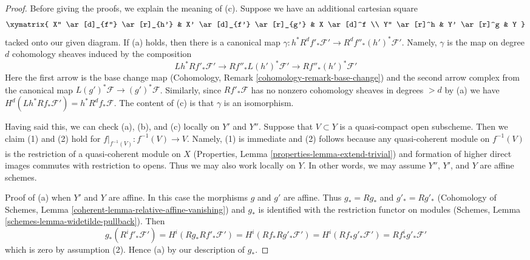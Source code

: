 \begin{proof}
Before giving the proofs, we explain the meaning of (c). Suppose
we have an additional cartesian square
$$
\xymatrix{
X'' \ar[d]_{f''} \ar[r]_{h'} &
X' \ar[d]_{f'} \ar[r]_{g'} &
X \ar[d]^f \\
Y'' \ar[r]^h &
Y' \ar[r]^g &
Y
}
$$
tacked onto our given diagram. If (a) holds, then there is a canonical
map $\gamma : h^*R^df'_*\mathcal{F}' \to R^df''_*(h')^*\mathcal{F}'$.
Namely, $\gamma$ is the map on degree $d$ cohomology sheaves
induced by the composition
$$
Lh^*Rf'_*\mathcal{F}' \longrightarrow
Rf''_*L(h')^*\mathcal{F}' \longrightarrow Rf''_*(h')^*\mathcal{F}'
$$
Here the first arrow is the base change map
(Cohomology, Remark \ref{cohomology-remark-base-change}) and
the second arrow complex from the canonical map
$L(g')^*\mathcal{F} \to (g')^*\mathcal{F}$.
Similarly, since $Rf'_*\mathcal{F}$ has no nonzero cohomology sheaves in
degrees $> d$ by (a) we have
$H^d(Lh^*Rf_*\mathcal{F}') = h^*R^df_*\mathcal{F}$.
The content of (c) is that $\gamma$ is an isomorphism.

\medskip\noindent
Having said this, we can check (a), (b), and (c) locally on $Y'$ and $Y''$.
Suppose that $V \subset Y$ is a quasi-compact open subscheme. Then we
claim (1) and (2) hold for $f|_{f^{-1}(V)} : f^{-1}(V) \to V$.
Namely, (1) is immediate and (2) follows because any quasi-coherent
module on $f^{-1}(V)$ is the restriction of a quasi-coherent module
on $X$ (Properties, Lemma \ref{properties-lemma-extend-trivial}) and formation
of higher direct images commutes with restriction to opens.
Thus we may also work locally on $Y$. In other words, we may
assume $Y''$, $Y'$, and $Y$ are affine schemes.

\medskip\noindent
Proof of (a) when $Y'$ and $Y$ are affine. In this case the morphisms
$g$ and $g'$ are affine. Thus $g_* = Rg_*$ and $g'_* = Rg'_*$
(Cohomology of Schemes, Lemma \ref{coherent-lemma-relative-affine-vanishing})
and $g_*$ is identified with the restriction functor on modules
(Schemes, Lemma \ref{schemes-lemma-widetilde-pullback}).
Then
$$
g_*(R^if'_*\mathcal{F}') = H^i(Rg_*Rf'_*\mathcal{F}') =
H^i(Rf_*Rg'_*\mathcal{F}') =
H^i(Rf_*g'_*\mathcal{F}') =
Rf^i_*g'_*\mathcal{F}'
$$
which is zero by assumption (2). Hence (a) by our description of $g_*$.


\end{proof}
